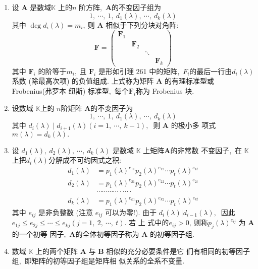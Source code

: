 \begin{enumerate}
		\item 设 $ \boldsymbol{A} $ 是数域$  \mathbb{K}$  上的$  n$  阶方阵,\   $\boldsymbol{A}  $的不变因子组为
		$$1,\  \cdots,\  1,\  d_{1}(\lambda),\  \cdots,\  d_{k}(\lambda)$$
		其中  $\operatorname{deg} d_{i}(\lambda)=m_{i} ,\  $则  $\boldsymbol{A}$ 相似于下列分块对角阵:
		$$\boldsymbol{F}=\left(\begin{array}{cccc}
			\boldsymbol{F}_{1} & & & \\
			& \boldsymbol{F}_{2} & & \\
			& & \ddots & \\
			& & & \boldsymbol{F}_{k}
		\end{array}\right)$$
		其中  $\boldsymbol{F}_{i} $ 的阶等于$  m_{i} ,\  $且 $ \boldsymbol{F}_{i} $ 是形如引理 261 中的矩阵,\  $ F_{i}  $的最后一行由$  d_{i}(\lambda)$  系数 (除最高次项) 的负值组成. 上式称为矩阵  $\boldsymbol{A} $ 的有理标准型或 Frobenius(弗罗本 纽斯) 标准型,\  每个$  \boldsymbol{F}_{i}  $称为 Frobenius 块.
		\item 设数域  $\mathbb{K}  $上的 $ n  $阶矩阵 $ \boldsymbol{A}  $的不变因子为
		$$1,\  \cdots,\  1,\  d_{1}(\lambda),\  \cdots,\  d_{k}(\lambda)$$
		其中 $ d_{i}(\lambda) \mid d_{i+1}(\lambda)(i=1,\  \cdots,\  k-1) ,\ $ 则  $\boldsymbol{A}$  的极小多 项式 $ m(\lambda)=d_{k}(\lambda) .$
		\item 设  $d_{1}(\lambda),\  d_{2}(\lambda),\  \cdots,\  d_{k}(\lambda)$  是数域 $ \mathbb{K} $ 上矩阵$  \boldsymbol{A}  $的非常数 不变因子,\  在  $\mathbb{K}  $上把$  d_{i}(\lambda)  $分解成不可约因式之积:
		$$\begin{aligned}
			d_{1}(\lambda) &=p_{1}(\lambda)^{e_{11}} p_{2}(\lambda)^{e_{12}} \cdots p_{t}(\lambda)^{e_{1 t}} \\
			d_{2}(\lambda) &=p_{1}(\lambda)^{e_{21}} p_{2}(\lambda)^{e_{22}} \cdots p_{t}(\lambda)^{e_{2 t}} \\
			& \cdots \cdots \cdots \cdots \cdot \cdots \cdot \\
			d_{k}(\lambda) &=p_{1}(\lambda)^{e_{k 1}} p_{2}(\lambda)^{e_{k 2}} \cdots p_{t}(\lambda)^{e_{k t}}
		\end{aligned}$$
		其中 $ e_{i j}$  是非负整数 (注意  $e_{i j} $ 可以为零!). 由于  $d_{i}(\lambda)  |  d_{i-1}(\lambda) ,\ $ 因此$  e_{1 j} \leqslant e_{2 j} \leqslant \cdots \leqslant e_{k j}(j=1,\ 2,\  \cdots,\  t) .$ 若 上 式中的$  e_{i j}>0 ,\  $则称$  p_{j}(\lambda)^{e_{i j}} $ 为 $ \boldsymbol{A} $ 的一个初等 因子,\   $\boldsymbol{A}  $的全体初等因子称为  $\boldsymbol{A} $ 的初等因子组.
		\item 数域 $ \mathbb{K}$  上的两个矩阵 $ \boldsymbol{A} $ 与  $\boldsymbol{B} $ 相似的充分必要条件是它 们有相同的初等因子组,\  即矩阵的初等因子组是矩阵相 似关系的全系不变量.

\end{enumerate}

